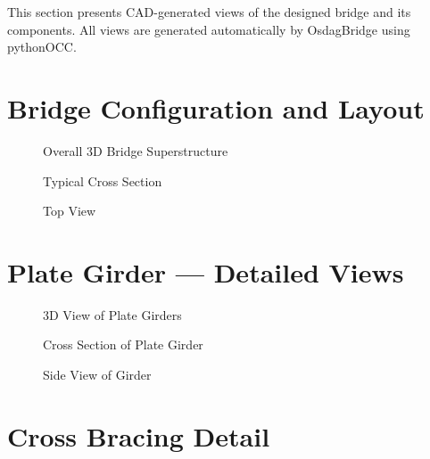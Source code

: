 \documentclass[12pt,a4paper]{report}
\numberwithin{table}{chapter}
\numberwithin{figure}{chapter}
\begin{document}
This section presents CAD-generated views of the designed bridge and its components. All views are generated automatically by OsdagBridge using pythonOCC.

\section{Bridge Configuration and Layout}
\label{sec:bridge-layout}

\begin{figure}[H]
\centering
{}
\caption{Overall 3D Bridge Superstructure}
\label{fig:bridge-3d}
\end{figure}


\begin{figure}[H]
\centering
{}
\caption{Typical Cross Section}
\label{fig:cross-section}
\end{figure}


\begin{figure}[H]
\centering
{}
\caption{Top View}
\label{fig:top-view}
\end{figure}


\section{Plate Girder --- Detailed Views}
\label{sec:girder-views}

\begin{figure}[H]
\centering
{}
\caption{3D View of Plate Girders}
\label{fig:girder-3d}
\end{figure}


\begin{figure}[H]
\centering
{}
\caption{Cross Section of Plate Girder}
\label{fig:girder-xsec}
\end{figure}


\begin{figure}[H]
\centering
{}
\caption{Side View of Girder}
\label{fig:girder-side}
\end{figure}


\section{Cross Bracing Detail}
\label{sec:bracing-detail}
\end{document}
